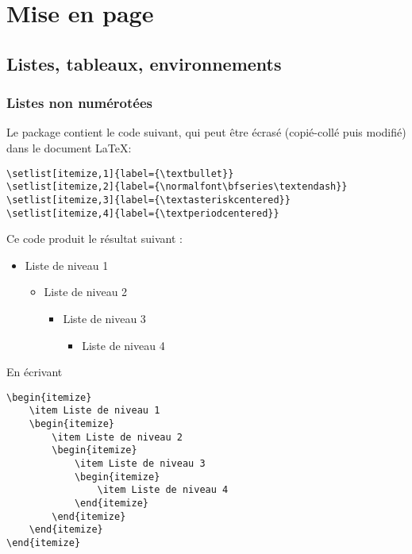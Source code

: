 \documentclass{article}
\begin{document}
\clearpage
\section{Mise en page}

\subsection{Listes, tableaux, environnements}

\subsubsection{Listes non numérotées}

Le package  contient le code suivant, qui peut être écrasé (copié-collé puis modifié) dans le document \LaTeX :

\begin{verbatim}
\setlist[itemize,1]{label={\textbullet}}
\setlist[itemize,2]{label={\normalfont\bfseries\textendash}}
\setlist[itemize,3]{label={\textasteriskcentered}}
\setlist[itemize,4]{label={\textperiodcentered}}
\end{verbatim}

Ce code produit le résultat suivant :

\begin{itemize}
    \item Liste de niveau 1
    \begin{itemize}
        \item Liste de niveau 2
        \begin{itemize}
            \item Liste de niveau 3
            \begin{itemize}
                \item Liste de niveau 4
            \end{itemize}
        \end{itemize}
    \end{itemize}
\end{itemize}

En écrivant

\begin{verbatim}
\begin{itemize}
    \item Liste de niveau 1
    \begin{itemize}
        \item Liste de niveau 2
        \begin{itemize}
            \item Liste de niveau 3
            \begin{itemize}
                \item Liste de niveau 4
            \end{itemize}
        \end{itemize}
    \end{itemize}
\end{itemize}
\end{verbatim}
\end{document}
